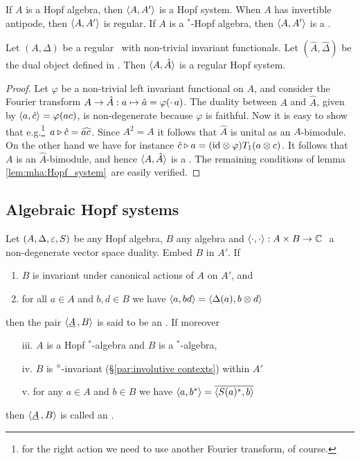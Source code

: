\begin{cor} \label{cor:Hopf_algebra_and_full_dual}
If $A$ is a Hopf algebra, then $\langle A,A' \rangle$ is a Hopf system.
When $A$ has invertible antipode, then $\langle A,A' \rangle$ is regular.
If $A$ is a $^*$-Hopf algebra, then $\langle A,A' \rangle$ is a \Hss\@.
\end{cor}



\begin{prop} \label{prop:AhatA:Hopf_system}
Let\/ $(A,\Delta)$ be a regular \mha\ with non-trivial invariant functionals.
Let\/ $(\hat{A},\hat{\Delta})$ be the dual object defined in \cite{Fons:AFGD:proc,Fons:AFGD}\@.
Then $\langle A,\hat{A} \rangle$ is a regular Hopf system.
\end{prop}
\begin{proof}
Let $\varphi$ be a non-trivial left invariant functional on $A$, and consider
the Fourier transform $A \rightarrow \hat{A}: a \mapsto \hat{a} = \varphi(\cdot\,a)$.
The duality between $A$ and $\hat{A}$, given by
$\langle a,\hat{c} \rangle = \varphi(ac)$, is non-degenerate because $\varphi$ is faithful.
Now it is easy to show that
e.g.\footnote{for the right action we need to use another Fourier transform, of
course.}\ $a \triangleright \hat{c} = \widehat{ac\,}\!$.
Since $A^2=A$ it follows that $\hat{A}$ is unital as an $A$-bimodule.
On the other hand we have for instance
$\hat{c} \triangleright a = (\mbox{\rm id} \otimes \varphi)T_1(a\otimes c)$.
It follows that $A$ is an $\hat{A}$-bimodule, and hence $\langle A,\hat{A} \rangle$ is a \dpa\@.
The remaining conditions of lemma \ref{lem:mha:Hopf_system}\ are easily verified.
\end{proof}




\subsection{Algebraic Hopf systems}

\begin{defn}  \label{def:algebraic_Hopf_system}
Let $(A,\Delta,\varepsilon,S)$ be any Hopf algebra, $B$ any algebra and
\mbox{$\langle\cdot, \cdot\rangle : A \times B \rightarrow \mathbb{C}\,$}\ a non-degenerate vector space duality.
Embed $B$ in $A'$. If
\begin{enumerate}
  \item $B$ is invariant under canonical actions of $A$ on $A'$, and
  \item for all $a \in A$ and $b,d \in B$ we have
        $\langle a,bd \rangle = \langle \Delta(a),b \otimes d \rangle$
\end{enumerate}
then the pair $\langle \underline{A}\,,B \rangle$ is said to be an {\em \ahs}\@. If
moreover
\begin{enumerate}
\item[iii.] $A$ is a Hopf $^*$-algebra and $B$ is a $^*$-algebra,
\item[iv.]  $B$ is $^\circ$-invariant (\S \ref{par:involutive contexts}) within $A'$
\item[v.]   for any $a \in A$ and $b \in B$ we have $\langle a,b^* \rangle = \overline{\langle S(a)^*,b \rangle}$
\end{enumerate}
then $\langle \underline{A}\,,B \rangle$ is called an {\em \ahss}.
\end{defn}

